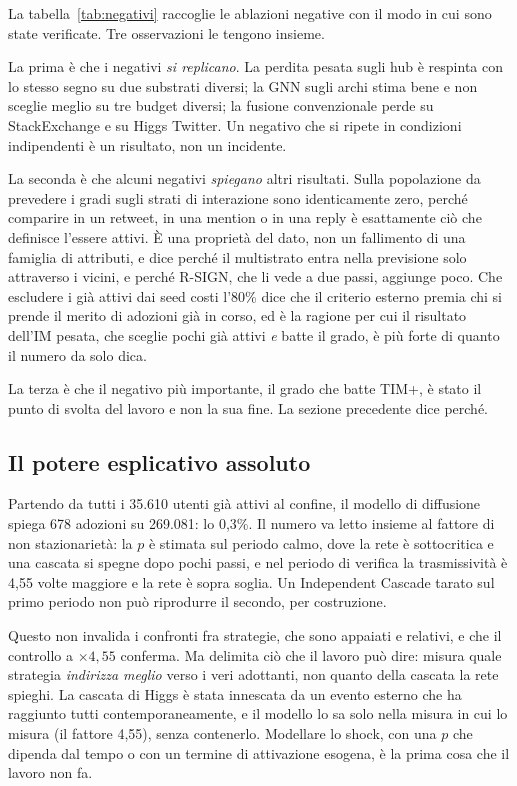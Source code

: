 \documentclass[11pt,a4paper]{article}
\newcommand{\sx}{StackExchange}
\newcommand{\hg}{Higgs Twitter}
\begin{document}
La tabella~\ref{tab:negativi} raccoglie le ablazioni negative con il modo in cui sono state verificate. Tre osservazioni le tengono insieme.

La prima è che i negativi \emph{si replicano}. La perdita pesata sugli hub è respinta con lo stesso segno su due substrati diversi; la GNN sugli archi stima bene e non sceglie meglio su tre budget diversi; la fusione convenzionale perde su \sx{} e su \hg{}. Un negativo che si ripete in condizioni indipendenti è un risultato, non un incidente.

La seconda è che alcuni negativi \emph{spiegano} altri risultati. Sulla popolazione da prevedere i gradi sugli strati di interazione sono identicamente zero, perché comparire in un retweet, in una mention o in una reply è esattamente ciò che definisce l'essere attivi. È una proprietà del dato, non un fallimento di una famiglia di attributi, e dice perché il multistrato entra nella previsione solo attraverso i vicini, e perché R-SIGN, che li vede a due passi, aggiunge poco. Che escludere i già attivi dai seed costi l'80\% dice che il criterio esterno premia chi si prende il merito di adozioni già in corso, ed è la ragione per cui il risultato dell'IM pesata, che sceglie pochi già attivi \emph{e} batte il grado, è più forte di quanto il numero da solo dica.

La terza è che il negativo più importante, il grado che batte TIM+, è stato il punto di svolta del lavoro e non la sua fine. La sezione precedente dice perché.

\subsection{Il potere esplicativo assoluto}
Partendo da tutti i 35.610 utenti già attivi al confine, il modello di diffusione spiega 678 adozioni su 269.081: lo 0,3\%. Il numero va letto insieme al fattore di non stazionarietà: la $p$ è stimata sul periodo calmo, dove la rete è sottocritica e una cascata si spegne dopo pochi passi, e nel periodo di verifica la trasmissività è 4,55 volte maggiore e la rete è sopra soglia. Un Independent Cascade tarato sul primo periodo non può riprodurre il secondo, per costruzione.

Questo non invalida i confronti fra strategie, che sono appaiati e relativi, e che il controllo a $\times 4{,}55$ conferma. Ma delimita ciò che il lavoro può dire: misura quale strategia \emph{indirizza meglio} verso i veri adottanti, non quanto della cascata la rete spieghi. La cascata di Higgs è stata innescata da un evento esterno che ha raggiunto tutti contemporaneamente, e il modello lo sa solo nella misura in cui lo misura (il fattore 4,55), senza contenerlo. Modellare lo shock, con una $p$ che dipenda dal tempo o con un termine di attivazione esogena, è la prima cosa che il lavoro non fa.
\end{document}
